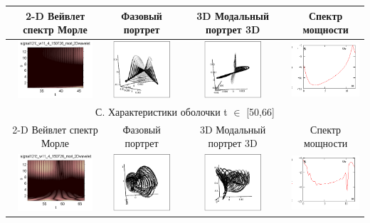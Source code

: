 \documentclass[12pt,letterpaper]{extreport}
\begin{document}
\begin{table}[H]
{\begin{tabular}{|c|c|c|c|}
\hline
\footnotesize 2-D Вейвлет спектр Морле&\footnotesize 
Фазовый портрет&\footnotesize 3D	Модальный портрет 
3D&\footnotesize Спектр мощности\\
\hline
	\includegraphics[height = 80px]{b1} 	
	&	
	\includegraphics[height = 80px]{b2} 	
	&	
	\includegraphics[height = 80px]{b3} 
	&
	\includegraphics[height = 80px]{b4} 
\\
\hline

\multicolumn{4}{|c|}{С. Характеристики оболочки  t $\in$ 
[50,66]}\\

\hline
\footnotesize 2-D Вейвлет спектр Морле&\footnotesize 
Фазовый портрет&\footnotesize 3D	Модальный портрет 
3D&\footnotesize Спектр мощности\\
\hline
	\includegraphics[height = 80px]{c1} 	
	&	
	\includegraphics[height = 80px]{c2} 	
	&	
	\includegraphics[height = 80px]{c3} 
	&
	\includegraphics[height = 80px]{c4} 
\\
\hline


\end{tabular}}
\end{table}
\end{document}
